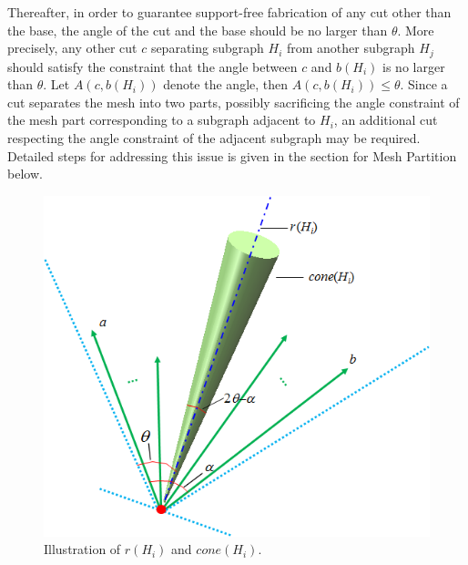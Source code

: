 Thereafter, in order to guarantee support-free fabrication of any cut other than the base, the angle of the cut and the base should be no larger than $\theta$. More precisely, any other cut $c$ separating subgraph $H_i$ from another subgraph $H_j$ should satisfy the constraint that the angle between $c$ and $b(H_i)$ is no larger than $\theta$. Let $A(c, b(H_i))$ denote the angle, then $A(c, b(H_i)) \leq \theta$. Since a cut separates the mesh into two parts, possibly sacrificing the angle constraint of the mesh part corresponding to a subgraph adjacent to $H_i$, an additional cut respecting the angle constraint of the adjacent subgraph may be required. Detailed steps for addressing this issue is given in the section for Mesh Partition below.

\begin{figure}[tbp]
  \centering
  \includegraphics[width=0.7\linewidth]{figs/cone.png}
  \caption{\label{fig:cone}%
           Illustration of $r(H_i)$ and $cone(H_i)$.}
\end{figure}




